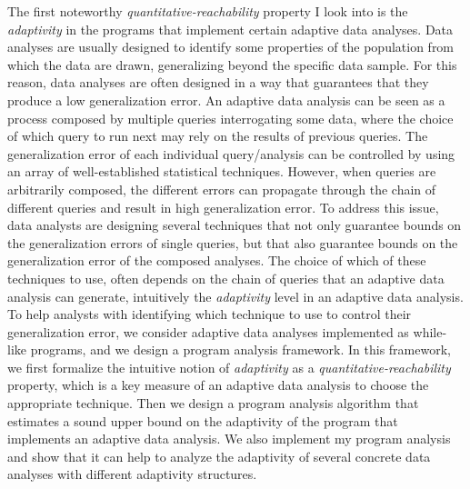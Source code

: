 \begin{abstractpage}
    The first noteworthy \emph{quantitative-reachability} property I look into is 
    the \emph{adaptivity}  
    in the programs that implement certain adaptive data analyses. 
    Data analyses are usually designed to identify some properties of the population from which the data are drawn, generalizing beyond the specific data sample. For this reason, data analyses are often designed in a way that guarantees that they produce a low generalization error.
    An adaptive data analysis can be seen as a process composed by multiple queries interrogating some data, where the choice of which query to run next may rely on the results of previous queries. 
    The generalization error of each individual query/analysis can be controlled by using an array of well-established statistical techniques.
    However, when queries are arbitrarily composed, the different errors can propagate through the chain of different queries and result in high generalization error. 
    To address this issue, data analysts are designing several techniques that not only guarantee bounds on the generalization errors of single queries, but that also guarantee bounds on the generalization error of the composed analyses. 
    The choice of which of these techniques to use, often depends on the chain of queries that an adaptive data analysis can generate, intuitively the \emph{adaptivity} level in an adaptive data analysis.
    To help analysts with identifying which technique to use to control their generalization error, we consider adaptive data analyses implemented as while-like programs, and we design a
    program analysis framework.
    In this framework, we first formalize the intuitive notion of \emph{adaptivity} as a \emph{quantitative-reachability} property,
    which is a key measure of an adaptive data analysis to choose the appropriate technique.
    Then we design a program analysis algorithm
    that estimates a sound upper bound on the adaptivity of the program that implements an adaptive data analysis. 
    We also implement my program analysis and show that it can help to analyze the adaptivity of several concrete data analyses with different adaptivity structures.


\end{abstractpage}
